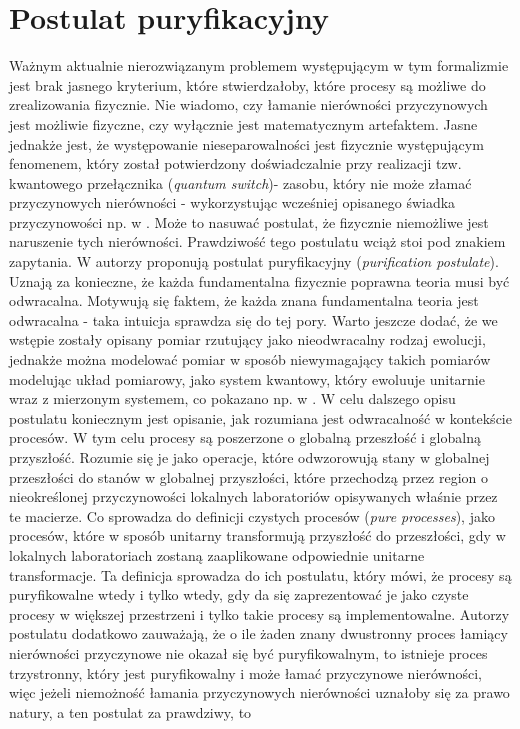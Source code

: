 \documentclass[10pt]{article} %
\begin{document}
\section{Postulat puryfikacyjny}
Ważnym aktualnie nierozwiązanym problemem występującym w tym formalizmie jest brak jasnego kryterium, które stwierdzałoby, które procesy są możliwe do zrealizowania fizycznie.
Nie wiadomo, czy łamanie nierówności przyczynowych jest możliwie fizyczne, czy wyłącznie jest matematycznym artefaktem. Jasne jednakże jest, że występowanie nieseparowalności jest fizycznie występującym fenomenem, który został potwierdzony doświadczalnie przy realizacji tzw. 
kwantowego przełącznika (\textit{quantum switch})- zasobu, który nie może złamać przyczynowych nierówności - wykorzystując wcześniej opisanego świadka przyczynowości np. w \cite{experiment}. Może to nasuwać postulat, że fizycznie niemożliwe jest naruszenie tych nierówności. Prawdziwość tego postulatu wciąż stoi pod znakiem zapytania. W \cite{purification} autorzy proponują postulat puryfikacyjny (\textit{purification postulate}). Uznają za konieczne, że każda fundamentalna fizycznie poprawna teoria
musi być odwracalna. Motywują się faktem, że każda znana fundamentalna teoria jest odwracalna - taka intuicja sprawdza się do tej pory.
Warto jeszcze dodać, że we wstępie zostały opisany pomiar rzutujący jako nieodwracalny rodzaj ewolucji, jednakże można modelować pomiar w sposób niewymagający takich pomiarów modelując układ pomiarowy, jako system kwantowy, który ewoluuje unitarnie wraz z mierzonym systemem, co pokazano np. w
\cite{reversible}. W celu dalszego opisu postulatu koniecznym jest opisanie, jak rozumiana jest odwracalność w kontekście procesów. W tym celu procesy są poszerzone o globalną przeszłość i globalną przyszłość. Rozumie się je jako operacje, które odwzorowują stany w globalnej przeszłości do stanów w globalnej przyszłości, które przechodzą przez region o nieokreślonej przyczynowości lokalnych laboratoriów opisywanych właśnie przez te macierze. Co sprowadza do definicji czystych procesów (\textit{pure processes}), jako procesów, które w sposób unitarny transformują przyszłość do przeszłości, gdy w lokalnych laboratoriach zostaną zaaplikowane odpowiednie unitarne transformacje. Ta definicja sprowadza do ich postulatu, który mówi, że procesy są puryfikowalne wtedy i tylko wtedy, gdy da się zaprezentować je jako czyste procesy w większej przestrzeni i tylko takie procesy są implementowalne. Autorzy postulatu dodatkowo zauważają, że
o ile żaden znany dwustronny proces łamiący nierówności przyczynowe nie okazał się być puryfikowalnym, to istnieje proces trzystronny, który jest puryfikowalny i może łamać przyczynowe nierówności, więc jeżeli niemożność łamania przyczynowych nierówności uznałoby się za prawo natury, a ten postulat za prawdziwy, to
\end{document}
